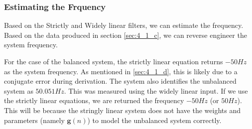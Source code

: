 \documentclass[./main.tex]{subfiles}
\begin{document}
\subsubsection{Estimating the Frquency}

Based on the Strictly and Widely linear filters, we can estimate the frequency. Based on the data produced in section \ref{sec:4_1_c}, we can reverse engineer the system frequency.

For the case of the balanced system, the strictly linear equation returns $ -50Hz$ as the system frequency. As mentioned in \ref{sec:4_1_d}, this is likely due to a conjugate error during derivation. The system also identifies the unbalanced system as $ 50.051Hz $. This was measured using the widely linear input. If we use the strictly linear equations, we are returned the frequency $ -50Hz$ (or $50Hz$). This will be because the stringly linear system does not have the weights and parameters (namely $ \mathbf{g}(n) $) to model the unbalanced system correctly.
\end{document}
